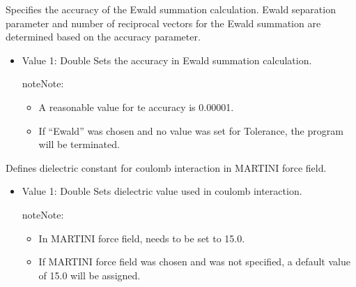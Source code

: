 \documentclass[letterpaper,10pt,english]{sphinxmanual}
\begin{document}
\begin{description}
\begin{itemize}
\end{itemize}

\item[{\sphinxcode{\sphinxupquote{Tolerance}}}] \leavevmode
\sphinxAtStartPar
Specifies the accuracy of the Ewald summation calculation. Ewald separation parameter and number of reciprocal vectors for the Ewald summation are determined based on the accuracy parameter.
\begin{itemize}
\item {} 
\sphinxAtStartPar
Value 1: Double \sphinxhyphen{} Sets the accuracy in Ewald summation calculation.

\begin{sphinxadmonition}{note}{Note:}\begin{itemize}
\item {} 
\sphinxAtStartPar
A reasonable value for te accuracy is 0.00001.

\item {} 
\sphinxAtStartPar
If “Ewald” was chosen and no value was set for Tolerance, the program will be terminated.

\end{itemize}
\end{sphinxadmonition}

\end{itemize}

\item[{\sphinxcode{\sphinxupquote{Dielectric}}}] \leavevmode
\sphinxAtStartPar
Defines dielectric constant for coulomb interaction in MARTINI force field.
\begin{itemize}
\item {} 
\sphinxAtStartPar
Value 1: Double \sphinxhyphen{} Sets dielectric value used in coulomb interaction.

\begin{sphinxadmonition}{note}{Note:}\begin{itemize}
\item {} 
\sphinxAtStartPar
In MARTINI force field,  needs to be set to 15.0.

\item {} 
\sphinxAtStartPar
If MARTINI force field was chosen and  was not specified, a default value of 15.0 will be assigned.

\end{itemize}
\end{sphinxadmonition}

\end{itemize}


\end{description}
\end{document}
